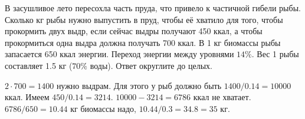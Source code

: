 
В засушливое лето пересохла часть пруда, что привело к частичной гибели
рыбы. Сколько кг рыбы нужно выпустить в пруд, чтобы её хватило для того, чтобы
прокормить двух выдр, если сейчас выдры получают 450 ккал, а чтобы прокормиться
одна выдра должна получать 700 ккал. В 1 кг биомассы рыбы запасается 650 ккал
энергии. Переход энергии между уровнями $14\%$. 
Вес 1 рыбы составляет 1.5 кг ($70\%$ воды). Ответ округлите до целых.

\solutionSection

$2 \cdot 700=1400$ нужно выдрам. Для этого у рыб должно быть $1400/0.14=10000$ ккал. Имеем $450/0.14=3214$. $10000-3214=6786$ ккал не хватает. \linebreak $6786/650 = 10.44$ кг биомассы надо, 
$10.44/0.3=34.8=35$ кг.

